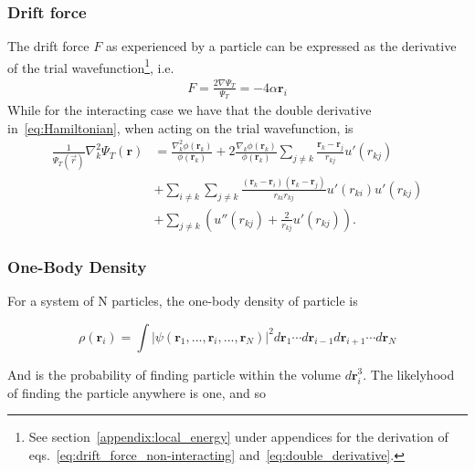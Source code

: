 \documentclass[
    a4paper, aps, twocolumn, floatfix, superscriptaddress,
    nofootinbib]{revtex4-1}
\begin{document}
\subsubsection{Drift force}\label{subsubsec:drift_force}
The drift force $F$ as experienced by a particle can be expressed as the derivative of the trial wavefunction\footnote{See section~\ref{appendix:local_energy} under appendices for the derivation of eqs.~\eqref{eq:drift_force_non-interacting} and~\eqref{eq:double_derivative}.}, i.e.
\begin{align}
    F = \frac{2\nabla \Psi_T}{\Psi_T} = -4\alpha \boldsymbol{r}_i \label{eq:drift_force_non-interacting}
\end{align}
While for the interacting case we have that the double derivative in~\eqref{eq:Hamiltonian}, when acting on the trial wavefunction, is
\begin{align}
    \frac{1}{\Psi_T(\vec r)} \nabla^{2}_{k} \Psi_{T}(\boldsymbol{r})  &=\frac{\nabla_k^2 \phi(\boldsymbol{r}_k)}{\phi(\boldsymbol{r}_k)} + 2\frac{\nabla_k \phi(\boldsymbol{r}_k)}{\phi(\boldsymbol{r}_k)} \sum_{j\neq k} \frac{\boldsymbol{r}_k-\boldsymbol{r}_j}{r_{kj}} u'(r_{kj})\label{eq:double_derivative} \\
    &+\sum_{i\neq k} \sum_{j \neq k} \frac{\left(\boldsymbol{r}_k - \boldsymbol{r}_i\right)\left(\boldsymbol{r}_k - \boldsymbol{r}_j\right)}{r_{ki} r_{kj}} u'(r_{ki}) u'(r_{kj})\nonumber\\
    &+\sum_{j\neq k}\left( u''(r_{kj}) + \frac{2}{r_{kj}}u'(r_{kj}) \right)\nonumber.
\end{align}

\subsubsection{One-Body Density}\label{subsubsec:one_body}
For a system of N particles, the one-body density of particle  is 

\begin{equation}
    \rho(\boldsymbol{r}_i) = \int |\psi(\boldsymbol{r}_1,...,\boldsymbol{r}_{i},...,\boldsymbol{r}_{N})|^2 d\boldsymbol{r}_1 \cdots d\boldsymbol{r}_{i-1} d\boldsymbol{r}_{i+1} \cdots d\boldsymbol{r}_{N}
\end{equation}

And is the probability of finding particle  within the volume $d\boldsymbol{r}_i^3$. The likelyhood of finding the particle anywhere is one, and so 
\end{document}
